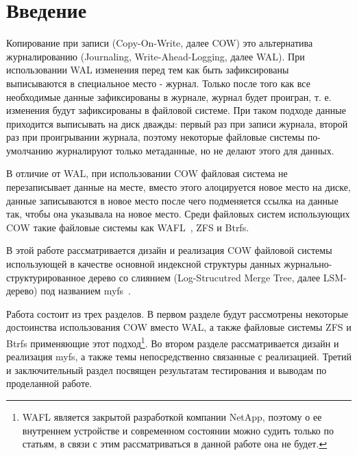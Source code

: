 \chapter{Введение}

Копирование при записи (Copy-On-Write, далее COW) это альтернатива
журналированию (Journaling, Write-Ahead-Logging, далее WAL). При использовании
WAL изменения перед тем как быть зафиксированы выписываются в специальное место
 - журнал. Только после того как все необходимые данные зафиксированы в
журнале, журнал будет проигран, т. е. изменения будут зафиксированы в файловой
системе. При таком подходе данные приходится выписывать на диск дважды: первый
раз при записи журнала, второй раз при проигрывании журнала, поэтому некоторые
файловые системы по-умолчанию журналируют только метаданные, но не делают этого
для данных.

В отличие от WAL, при использовании COW файловая система не перезаписывает
данные на месте, вместо этого алоцируется новое место на диске, данные
записываются в новое место после чего подменяется ссылка на данные так, чтобы
она указывала на новое место. Среди файловых систем использующих COW такие
файловые системы как WAFL~\cite{WAFL}, ZFS и Btrfs.

В этой работе рассматривается дизайн и реализация COW файловой системы
использующей в качестве основной индексной структуры данных
журнально-структурированное дерево со слиянием (Log-Strucutred Merge Tree, далее
LSM-дерево) под названием myfs~\cite{MYFS}.

Работа состоит из трех разделов. В первом разделе будут рассмотрены некоторые
достоинства использования COW вместо WAL, а также файловые системы ZFS и Btrfs
применяющие этот подход\footnote{WAFL является закрытой разработкой компании
NetApp, поэтому о ее внутреннем устройстве и современном состоянии можно судить
только по статьям, в связи с этим рассматриваться в данной работе она не
будет.}. Во втором разделе рассматривается дизайн и реализация myfs, а также
темы непосредственно связанные с реализацией. Третий и заключительный раздел
посвящен результатам тестирования и выводам по проделанной работе.




